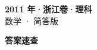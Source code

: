 \documentclass[zihao=-4, a4paper]{ctexart}
\begin{document}
\begin{center}
  {\Large\bfseries 2011 年·浙江卷·理科}\\[4pt]
  {\large 数学 · 简答版}
\end{center}
\medskip
{}

\clearpage
{}
\begin{center}{\Large\bfseries 答案速查}\end{center}
\medskip

\end{document}
